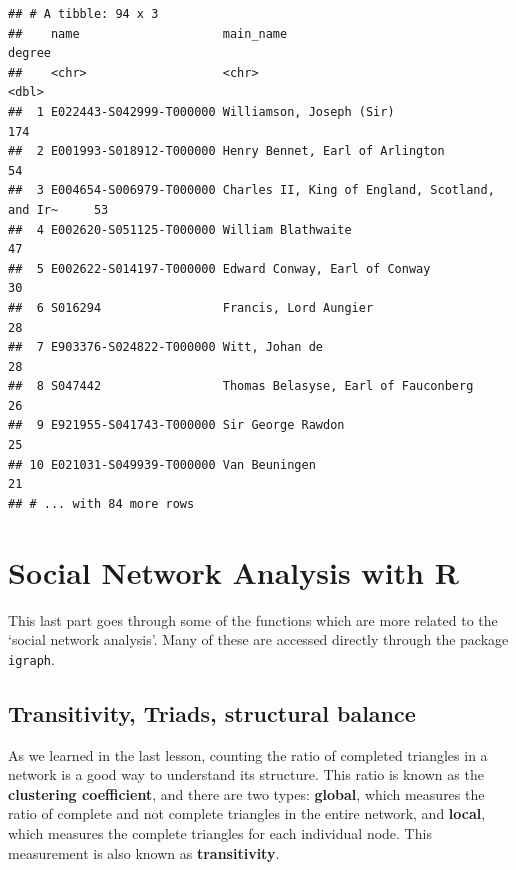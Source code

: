 \documentclass[
]{book}
\begin{document}
\begin{verbatim}
## # A tibble: 94 x 3
##    name                    main_name                                      degree
##    <chr>                   <chr>                                           <dbl>
##  1 E022443-S042999-T000000 Williamson, Joseph (Sir)                          174
##  2 E001993-S018912-T000000 Henry Bennet, Earl of Arlington                    54
##  3 E004654-S006979-T000000 Charles II, King of England, Scotland, and Ir~     53
##  4 E002620-S051125-T000000 William Blathwaite                                 47
##  5 E002622-S014197-T000000 Edward Conway, Earl of Conway                      30
##  6 S016294                 Francis, Lord Aungier                              28
##  7 E903376-S024822-T000000 Witt, Johan de                                     28
##  8 S047442                 Thomas Belasyse, Earl of Fauconberg                26
##  9 E921955-S041743-T000000 Sir George Rawdon                                  25
## 10 E021031-S049939-T000000 Van Beuningen                                      21
## # ... with 84 more rows
\end{verbatim}

\hypertarget{social-network-analysis-with-r}{%
\section{Social Network Analysis with R}\label{social-network-analysis-with-r}}

This last part goes through some of the functions which are more related to the `social network analysis'. Many of these are accessed directly through the package \texttt{igraph}.

\hypertarget{transitivity-triads-structural-balance}{%
\subsection{Transitivity, Triads, structural balance}\label{transitivity-triads-structural-balance}}

As we learned in the last lesson, counting the ratio of completed triangles in a network is a good way to understand its structure. This ratio is known as the \textbf{clustering coefficient}, and there are two types: \textbf{global}, which measures the ratio of complete and not complete triangles in the entire network, and \textbf{local}, which measures the complete triangles for each individual node. This measurement is also known as \textbf{transitivity}.
\end{document}

